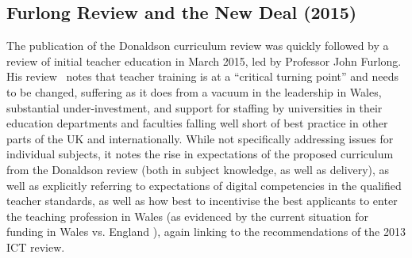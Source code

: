\documentclass{sig-alternate}
\begin{document}

\subsection{Furlong Review and the New Deal (2015)}

The publication of the Donaldson curriculum review was quickly
followed by a review of initial teacher education in March 2015, led
by Professor John Furlong. His review~\cite{Furlong:2015} notes
that teacher training is at a ``critical turning point'' and needs
to be changed, 
suffering as it does from
a vacuum in the leadership in Wales, substantial under-investment,
and support for staffing by universities in their
education departments and faculties falling well short of best
practice in other parts of the UK and internationally. While not
specifically addressing issues for individual subjects, it notes the
rise in expectations of the proposed curriculum from the Donaldson
review (both in subject knowledge, as well as delivery), as well as
explicitly referring to expectations of digital competencies in the
qualified teacher standards, as well as how best to incentivise the
best applicants to enter the teaching profession in Wales
(as evidenced by the current situation for funding in
Wales %
vs. England%
),
again linking to the recommendations of the 2013 ICT review.
\end{document}
